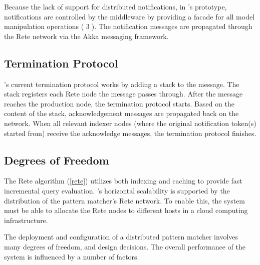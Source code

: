 Because the lack of support for distributed notifications, in \iqd{}'s prototype, notifications are controlled by the middleware by providing a facade for all model manipulation operations ( \textcircled{3}). The notification messages are propagated through the Rete network via the Akka messaging framework. 

\subsection{Termination Protocol}

\iqd{}'s current termination protocol works by adding a stack to the message. The stack registers each Rete node the message passes through. After the message reaches the production node, the termination protocol starts. Based on the content of the stack, acknowledgement messages are propagated back on the network. When all relevant indexer nodes (where the original notification token(s) started from) receive the acknowledge messages, the termination protocol finishes.

\subsection{Degrees of Freedom}
 
The Rete algorithm (\autoref{rete}) utilizes both indexing and caching to provide fast incremental query evaluation. \iqd{}'s horizontal scalability is supported by the distribution of the pattern matcher's Rete network. To enable this, the system must be able to allocate the Rete nodes to different hosts in a cloud computing infrastructure. 

The deployment and configuration of a distributed pattern matcher involves many degrees of freedom, and design decisions. The overall performance of the system is influenced by a number of factors.


